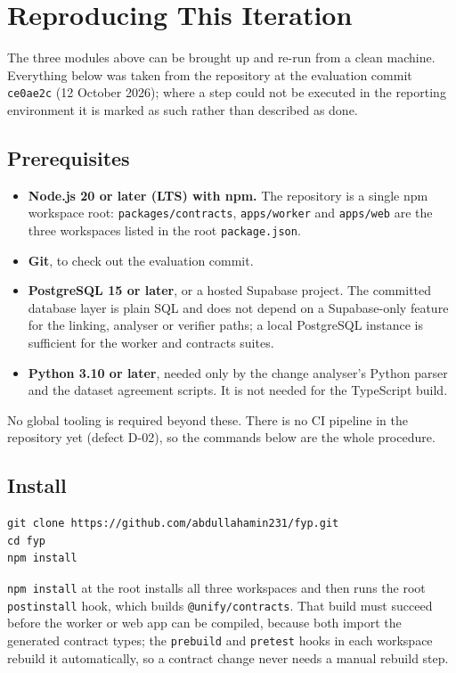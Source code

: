 \section{Reproducing This Iteration}
\label{sec:ch6-repro}

The three modules above can be brought up and re-run from a clean machine.
Everything below was taken from the repository at the evaluation commit
\texttt{ce0ae2c} (12 October 2026); where a step could not be executed in the
reporting environment it is marked as such rather than described as done.

\subsection{Prerequisites}

\begin{itemize}
\item \textbf{Node.js 20 or later (LTS) with npm.} The repository is a single
  npm workspace root: \texttt{packages/contracts}, \texttt{apps/worker} and
  \texttt{apps/web} are the three workspaces listed in the root
  \texttt{package.json}.
\item \textbf{Git}, to check out the evaluation commit.
\item \textbf{PostgreSQL 15 or later}, or a hosted Supabase project. The
  committed database layer is plain SQL and does not depend on a Supabase-only
  feature for the linking, analyser or verifier paths; a local PostgreSQL
  instance is sufficient for the worker and contracts suites.
\item \textbf{Python 3.10 or later}, needed only by the change analyser's
  Python parser and the dataset agreement scripts. It is not needed for the
  TypeScript build.
\end{itemize}

No global tooling is required beyond these. There is no CI pipeline in the
repository yet (defect D-02), so the commands below are the whole procedure.

\subsection{Install}

\begin{verbatim}
git clone https://github.com/abdullahamin231/fyp.git
cd fyp
npm install
\end{verbatim}

\texttt{npm install} at the root installs all three workspaces and then runs
the root \texttt{postinstall} hook, which builds \texttt{@unify/contracts}.
That build must succeed before the worker or web app can be compiled, because
both import the generated contract types; the \texttt{prebuild} and
\texttt{pretest} hooks in each workspace rebuild it automatically, so a
contract change never needs a manual rebuild step.

